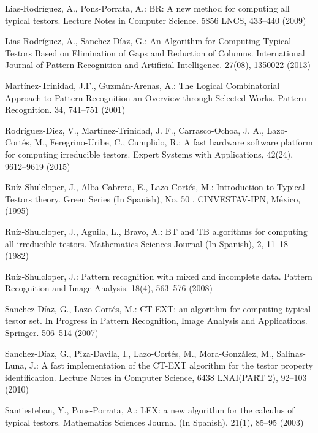 \documentclass[citeauthoryear]{llncs}
\begin{document}
\begin{thebibliography}{}
	Lias-Rodr\'iguez, A., Pons-Porrata, A.:
	BR: A new method for computing all typical testors. 
	Lecture Notes in Computer Science.
	5856 LNCS, 433--440 (2009)

	Lias-Rodr\'iguez, A., Sanchez-D\'iaz, G.:
 	An Algorithm for Computing Typical Testors Based on Elimination of Gaps and Reduction of Columns.
 	International Journal of Pattern Recognition and Artificial Intelligence. 27(08), 1350022 (2013)

	Mart\'inez-Trinidad, J.F., Guzm\'an-Arenas, A.: 
	The Logical Combinatorial Approach to Pattern Recognition an Overview through Selected Works. 
	Pattern Recognition. 34, 741--751 (2001)

	Rodríguez-Diez, V., Martínez-Trinidad, J. F., Carrasco-Ochoa, J. A., Lazo-Cortés, M., Feregrino-Uribe, C., Cumplido, R.:
	A fast hardware software platform for computing irreducible testors. 
	Expert Systems with Applications, 
	42(24), 9612–9619 (2015)

	Ruíz-Shulcloper, J., Alba-Cabrera, E., Lazo-Cort\'es, M.:
	Introduction to Typical Testors theory.
	Green Series (In Spanish), No. 50 . CINVESTAV-IPN, México, (1995)
	
	Ruíz-Shulcloper, J., Aguila, L., Bravo, A.:
	BT and TB algorithms for computing all irreducible testors. 
	Mathematics Sciences Journal (In Spanish), 2, 11--18 (1982)

	Ruíz-Shulcloper, J.:
	Pattern recognition with mixed and incomplete data. 
	Pattern Recognition and Image Analysis. 18(4), 563--576 (2008)
	
	Sanchez-D\'iaz, G., Lazo-Cort\'es, M.:
	CT-EXT: an algorithm for computing typical testor set. 
	In Progress in Pattern Recognition, Image Analysis and Applications. 
	Springer. 506--514 (2007)

	Sanchez-D\'iaz, G., Piza-Davila, I., Lazo-Cort\'es, M., Mora-Gonz\'alez, M., Salinas-Luna, J.:
	A fast implementation of the CT-EXT algorithm for the testor property identification. 
	Lecture Notes in Computer Science, 6438 LNAI(PART 2), 92--103 (2010)

	Santiesteban, Y., Pons-Porrata, A.:
	LEX: a new algorithm for the calculus of typical testors. 
	Mathematics Sciences Journal (In Spanish), 21(1), 85--95 (2003)
	
	
\end{thebibliography}

%
\end{document}
